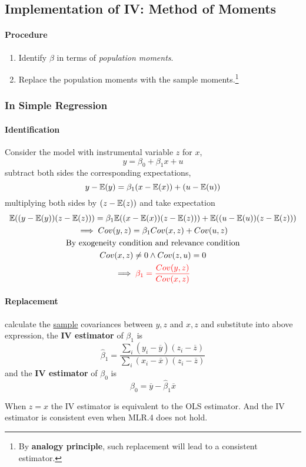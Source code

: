 \documentclass[]{article}
\begin{document}
		\subsection{Implementation of IV: Method of Moments}
			\paragraph{Procedure}
				\begin{enumerate}
					\item Identify $\beta$ in terms of \emph{population moments}.
					\item Replace the population moments with the sample moments.\footnote{By \textbf{analogy principle}, such replacement will lead to a consistent estimator.}
				\end{enumerate}
			\subsubsection{In Simple Regression}
				\paragraph{Identification} Consider the model with instrumental variable $z$ for $x$,
					\[
						y = \beta_0 + \beta_1 x + u
					\]
					subtract both sides the corresponding expectations,
					\[
						y - \mathbb{E}({y}) = \beta_1 (x - \mathbb{E}({x})) + (u - \mathbb{E}({u}))
					\]
					multiplying both sides by $(z - \mathbb{E}({z}))$ and take expectation
					\begin{gather*}
						\mathbb{E}({(y-\mathbb{E}({y}))(z-\mathbb{E}({z}))}) = \beta_1\mathbb{E}({(x-\mathbb{E}({x}))(z-\mathbb{E}({z}))}) + \mathbb{E}({(u-\mathbb{E}({u}))(z-\mathbb{E}({z}))}) \\
						\implies Cov(y, z) = \beta_1 Cov(x,z) + Cov(u,z) \\
						\text{{By exogeneity condition and relevance condition}} \\
						Cov(x,z) \neq 0 \land Cov(z,u) = 0\\
						\implies \textcolor{red}{\beta_1 = \frac{Cov(y,z)}{Cov(x,z)}}
					\end{gather*}
				\paragraph{Replacement} calculate the \ul{sample} covariances between $y,z$ and $x,z$ and substitute into above expression, the \textbf{IV estimator} of $\beta_1$ is
				\[
					\hat{\beta}_1 = \frac{\sum_i (y_i - \overline{y})(z_i - \overline{z})}{\sum_i(x_i - \overline{x})(z_i - \overline{z})} 
				\]
				and the \textbf{IV estimator} of $\beta_0$ is 
				\[
					\hat{\beta}_0 = \overline{y} - \hat{\beta}_1 \overline{x}
				\]
				\begin{remark}
					When $z=x$ the IV estimator is equivalent to the OLS estimator. And the IV estimator is consistent even when MLR.4 does not hold.
				\end{remark}
\end{document}
